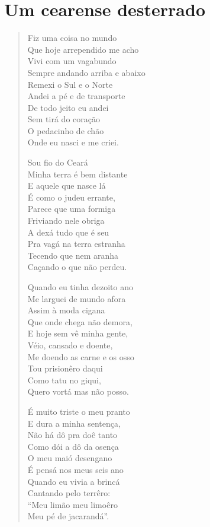 \chapter{Um cearense desterrado}

\begin{verse}
Fiz uma coisa no mundo\\
Que hoje arrependido me acho\\
Vivi com um vagabundo\\
Sempre andando arriba e abaixo\\
Remexi o Sul e o Norte\\
Andei a pé e de transporte\\
De todo jeito eu andei\\
Sem tirá do coração\\
O pedacinho de chão\\
Onde eu nasci e me criei.

Sou fio do Ceará\\
Minha terra é bem distante\\
E aquele que nasce lá\\
É como o judeu errante,\\
Parece que uma formiga\\
Friviando nele obriga\\
A dexá tudo que é seu\\
Pra vagá na terra estranha\\
Tecendo que nem aranha\\
Caçando o que não perdeu.

Quando eu tinha dezoito ano\\
Me larguei de mundo afora\\
Assim à moda cigana\\
Que onde chega não demora,\\
E hoje sem vê minha gente,\\
Véio, cansado e doente,\\
Me doendo as carne e os osso\\
Tou prisionêro daqui\\
Como tatu no giqui,\\
Quero vortá mas não posso.

É muito triste o meu pranto\\
E dura a minha sentença,\\
Não há dô pra doê tanto\\
Como dói a dô da osença\\
O meu maió desengano\\
É pensá nos meus seis ano\\
Quando eu vivia a brincá\\
Cantando pelo terrêro:\\
``Meu limão meu limoêro\\
Meu pé de jacarandá''.


\end{verse}
